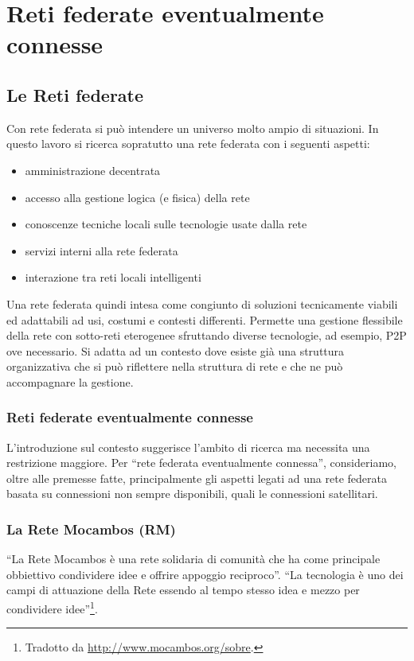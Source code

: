 
\chapter{Reti federate eventualmente connesse}
\label{Capitolo2}

\section{Le Reti federate}
Con rete federata si può intendere un universo molto ampio di
situazioni. In questo lavoro si ricerca sopratutto una rete federata
con i seguenti aspetti:
\begin{itemize}
  \item amministrazione decentrata 
  \item accesso alla gestione logica (e fisica) della rete
  \item conoscenze tecniche locali sulle tecnologie usate dalla rete
  \item servizi interni alla rete federata
  \item interazione tra reti locali intelligenti
\end{itemize} 

Una rete federata quindi intesa come congiunto di soluzioni
tecnicamente viabili ed adattabili ad usi, costumi e contesti
differenti. Permette una gestione flessibile della rete con sotto-reti
eterogenee sfruttando diverse tecnologie, ad esempio, P2P ove
necessario. Si adatta ad un contesto dove esiste già una struttura
organizzativa che si può riflettere nella struttura di rete e che ne
può accompagnare la gestione.

\subsection{Reti federate eventualmente connesse}
L'introduzione sul contesto suggerisce l'ambito di ricerca ma
necessita una restrizione maggiore. Per ``rete
federata eventualmente connessa'', consideriamo, oltre alle premesse
fatte, principalmente gli aspetti legati ad una rete federata basata
su connessioni non sempre disponibili, quali le connessioni
satellitari.

\subsection{La Rete Mocambos (RM)}
\label{sec:ReteMocambos}
``La Rete Mocambos è una rete solidaria di comunità che ha come
principale obbiettivo condividere idee e offrire appoggio reciproco''.
``La tecnologia è uno dei campi di attuazione della Rete essendo al
tempo stesso idea e mezzo per condividere idee''\footnote{Tradotto da
  \url{http://www.mocambos.org/sobre}.}.

